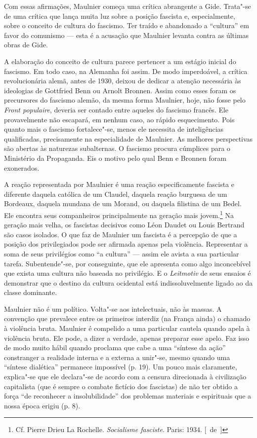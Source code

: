 Com essas afirmações, Maulnier começa uma crítica abrangente a Gide. Trata"-se de
uma crítica que lança muita luz sobre a posição fascista e,
especialmente, sobre o conceito de cultura do fascismo. Ter traído e
abandonado a ``cultura'' em favor do comunismo --- esta é a acusação que
Maulnier levanta contra as últimas obras de Gide.

A elaboração do conceito de cultura parece pertencer a um estágio
inicial do fascismo. Em todo caso, na Alemanha foi assim. De modo
imperdoável, a crítica revolucionária alemã, antes de 1930, deixou de
dedicar a atenção necessária às ideologias de Gottfried Benn ou Arnolt
Bronnen. Assim como esses foram os precursores do fascismo alemão, da mesma
forma Maulnier, hoje, não fosse pelo \emph{Front populaire}, deveria ser
contado entre aqueles do fascismo francês. Ele provavelmente não
escapará, em nenhum caso, ao rápido esquecimento. Pois quanto mais o
fascismo fortalece"-se, menos ele necessita de inteligências
qualificadas, precisamente na especialidade de Maulnier. As melhores
perspectivas são abertas às naturezas subalternas. O fascismo procura
cúmplices para o Ministério da Propaganda. Eis o motivo pelo qual Benn e Bronnen
foram exonerados.

A reação representada por Maulnier é uma reação especificamente fascista
e diferente daquela católica de um Claudel, daquela reação burguesa de
um Bordeaux, daquela mundana de um Morand, ou daquela filistina de um
Bedel. Ele encontra seus companheiros principalmente na geração mais
jovem.\footnote{Cf. Pierre Drieu La Rochelle. \emph{Socialisme
  fasciste}. Paris: 1934. [~de~]} Na geração mais velha, os fascistas
decisivos como Léon Daudet ou Louis Bertrand são casos isolados. O que
faz de Maulnier um fascista é a percepção de que a posição dos
privilegiados pode ser afirmada apenas pela violência. Representar a soma
de seus privilégios como ``a cultura'' --- assim ele avista a sua
particular tarefa. Subentende"-se, por conseguinte, que ele apresenta
como algo inconcebível que exista uma cultura não baseada no privilégio. E o
\emph{Leitmotiv} de seus ensaios é demonstrar que o destino da cultura
ocidental está indissoluvelmente ligado ao da classe dominante.

Maulnier não é um político. Volta"-se aos intelectuais, não às massas. A
convenção que prevalece entre os primeiros interdiz (na França ainda) o
chamado à violência bruta. Maulnier é compelido a uma particular cautela
quando apela à violência bruta. Ele pode, a dizer a verdade, apenas
preparar esse apelo. Faz isso de modo muito hábil quando proclama que
cabe a uma ``síntese da ação'' constranger a realidade interna e a
externa a unir"-se, mesmo quando uma ``síntese dialética'' permanece impossível (p.
19). Um pouco mais claramente, explica"-se que ele declara"-se de acordo
com a censura direcionada à civilização capitalista (que é sempre o
combate fictício dos fascistas) de não ter obtido a força ``de reconhecer
a insolubilidade'' dos problemas materiais e espirituais que
a nossa época erigiu (p. 8).

